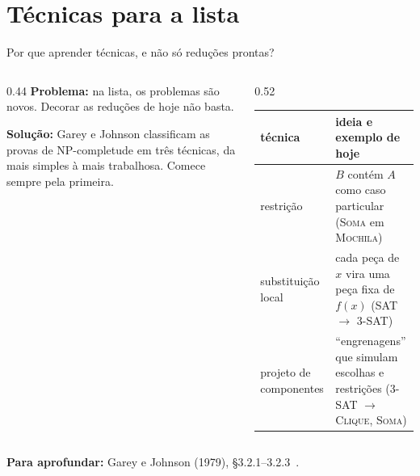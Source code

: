 \documentclass[aspectratio=169,xcolor=table]{beamer}
\newcommand{\fonte}[1]{%
  \vfill
  {\tiny\color{gray!55!black}\textbf{Para aprofundar:} #1\par}%
}
\newcommand{\prob}[1]{\textsc{#1}}
\begin{document}
\section{Técnicas para a lista}

\begin{frame}{Por que aprender técnicas, e não só reduções prontas?}
  \begin{columns}[T]
    \begin{column}{0.44\textwidth}
      \small
      \textbf{Problema:} na lista, os problemas são novos. Decorar as reduções de hoje não
      basta.
      \medskip

      \textbf{Solução:} Garey e Johnson classificam as provas de NP-completude em três
      técnicas, da mais simples à mais trabalhosa. Comece sempre pela primeira.
    \end{column}
    \begin{column}{0.52\textwidth}
      \scriptsize
      \centering
      \begin{tabular}{>{\raggedright\arraybackslash}p{2.1cm}>{\raggedright\arraybackslash}p{3.6cm}}
        \toprule
        técnica & ideia e exemplo de hoje \\
        \midrule
        restrição & $B$ contém $A$ como caso particular (\prob{Soma} em \prob{Mochila}) \\
        substituição local & cada peça de $x$ vira uma peça fixa de $f(x)$ (\prob{SAT} $\to$ \prob{3-SAT}) \\
        projeto de componentes & ``engrenagens'' que simulam escolhas e restrições (\prob{3-SAT} $\to$ \prob{Clique}, \prob{Soma}) \\
        \bottomrule
      \end{tabular}
    \end{column}
  \end{columns}
  \fonte{Garey e Johnson (1979), \S 3.2.1--3.2.3~\cite{garey1979computers}.}
\end{frame}
\end{document}
